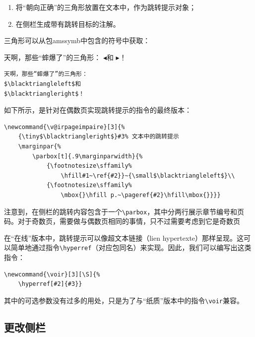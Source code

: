 \begin{enumerate}
    \item 将“朝向正确”的三角形放置在文本中，作为跳转提示对象；
    \item 在侧栏生成带有跳转目标的注解。
\end{enumerate}

三角形可以从包\textsf{amssymb}中包含的符号中获取：

\begin{codelist}[11.4]{
    天啊，那些“蟀爆了”的三角形：
$\blacktriangleleft$和
$\blacktriangleright$！
}
\begin{verbatim}
天啊，那些“蟀爆了”的三角形：
$\blacktriangleleft$和
$\blacktriangleright$！\end{verbatim}
\end{codelist}

如下所示，是针对在偶数页实现跳转提示的指令的最终版本：

\begin{dmd}
\begin{verbatim}
\newcommand{\v@irpageimpaire}[3]{% 
    {\tiny$\blacktriangleright$}#3% 文本中的跳转提示
    \marginpar{%
        \parbox[t]{.9\marginparwidth}{% 
            {\footnotesize\sffamily%
                \hfill#1~\ref{#2}}~{\small$\blacktriangleleft$}\\
            {\footnotesize\sffamily%
                \mbox{}\hfill p.~\pageref{#2}\hfill\mbox{}}}}\end{verbatim}
\end{dmd}%

注意到，在侧栏的跳转内容包含于一个\verb|\parbox|，其中分两行展示章节编号和页码。对于奇数页，需要做与偶数页相同的事情，只不过需要考虑到它是奇数页\dm{:-)}

在“在线”版本中，跳转提示可以像超文本链接（lien hypertexte）那样呈现。这可以简单地通过指令\verb|\hyperref|（对应包同名）来实现。因此，我们可以编写出这类指令：

\begin{dmd}
\begin{verbatim}
\newcommand{\voir}[3][\S]{% 
    \hyperref[#2]{#3}}\end{verbatim}
\end{dmd}

其中的可选参数没有过多的用处，只是为了与“纸质”版本中的指令\verb+\voir+兼容。

\subsection{更改侧栏}

